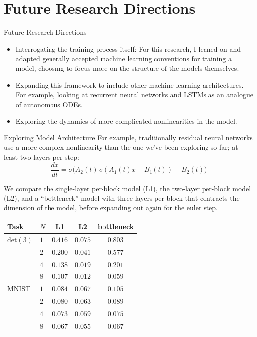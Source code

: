 \documentclass[aspectratio=169]{beamer}
\begin{document}
\section{Future Research Directions}
\begin{frame}{Future Research Directions}
\begin{itemize}
\item Interrogating the training process itself: For this research, I leaned on and adapted generally accepted machine learning conventions for training a model, choosing to focus more on the structure of the models themselves.
\item Expanding this framework to include other machine learning architectures. For example, looking at recurrent neural networks and LSTMs as an analogue of autonomous ODEs.
\item Exploring the dynamics of more complicated nonlinearities in the model.
\end{itemize}
\end{frame}

\begin{frame}{Exploring Model Architecture}
For example, traditionally residual neural networks use a more complex nonlinearity than the one we've been exploring so far; at least two layers per step:
$$\frac{dx}{dt} = \sigma\!\bigl(A_2(t)\,\sigma(A_1(t)x+B_1(t))+B_2(t)\bigr)$$

We compare the single-layer per-block model (L1), the two-layer per-block model (L2), and a  ``bottleneck'' model with three layers per-block that contracts the dimension of the model, before expanding out again for the euler step.
\begin{center}
\scriptsize\setlength{\tabcolsep}{8pt}\begin{tabular}{llccc}
\toprule
Task & $N$ & L1 & L2 & bottleneck \\
\midrule
det$(3)$ & $1$ & $0.416$ & $0.075$ & $0.803$ \\
         & $2$ & $0.200$ & $0.041$ & $0.577$ \\
         & $4$ & $0.138$ & $0.019$ & $0.201$ \\
         & $8$ & $0.107$ & $0.012$ & $0.059$ \\
\midrule
MNIST    & $1$ & $0.084$ & $0.067$ & $0.105$ \\
         & $2$ & $0.080$ & $0.063$ & $0.089$ \\
         & $4$ & $0.073$ & $0.059$ & $0.075$ \\
         & $8$ & $0.067$ & $0.055$ & $0.067$ \\
\bottomrule
\end{tabular}
\end{center}
\end{frame}
\end{document}
